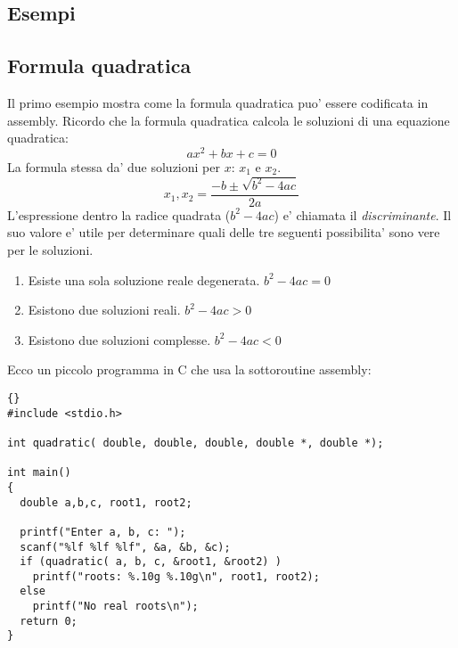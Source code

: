 \subsection{Esempi}

\subsection{Formula quadratica}

Il primo esempio mostra come la formula quadratica puo' essere codificata
in assembly. Ricordo che la formula quadratica calcola le soluzioni di una
equazione quadratica:
\[ a x^2 + b x + c = 0 \]
La formula stessa da' due soluzioni per $x$: $x_1$ e $x_2$.
\[ x_1, x_2 = \frac{-b \pm \sqrt{b^2 - 4 a c}}{2 a} \]
L'espressione dentro la radice quadrata ($b^2 - 4 a c$) e' chiamata
il \emph{discriminante}. Il suo valore e' utile per determinare quali
delle tre seguenti possibilita' sono vere per le soluzioni.
\begin{enumerate}
\item Esiste una sola soluzione reale degenerata. $b^2 - 4 a c = 0$
\item Esistono due soluzioni reali. $b^2 - 4 a c > 0$
\item Esistono due soluzioni complesse. $b^2 - 4 a c < 0$
\end{enumerate}

Ecco un piccolo programma in C che usa la sottoroutine assembly:
\begin{lstlisting}{}
#include <stdio.h>

int quadratic( double, double, double, double *, double *);

int main()
{
  double a,b,c, root1, root2;

  printf("Enter a, b, c: ");
  scanf("%lf %lf %lf", &a, &b, &c);
  if (quadratic( a, b, c, &root1, &root2) )
    printf("roots: %.10g %.10g\n", root1, root2);
  else
    printf("No real roots\n");
  return 0;
}
\end{lstlisting}

